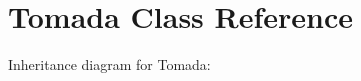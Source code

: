 \hypertarget{class_tomada}{}\section{Tomada Class Reference}
\label{class_tomada}


Inheritance diagram for Tomada\+:
